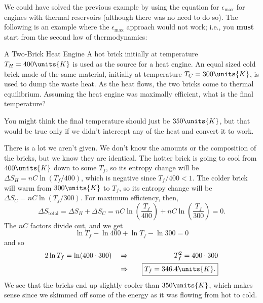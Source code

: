 We could have solved the previous example by using the equation for
$\epsilon_\text{max}$ for engines with thermal reservoirs (although 
there was no need to do so).  The following is an example where 
the $\epsilon_\text{max}$ approach would not work; i.e., you
{\bf must} start from the second law of thermodynamics:
\begin{example}{A Two-Brick Heat Engine}
  \label{example:two_brick_heat_engine}
  A hot brick initially at temperature $T_H=400\units{K}$ is used as
  the source for a heat engine.  An equal sized cold brick made of the
  same material, initially at temperature $T_C=300\units{K}$, is used
  to dump the waste heat.  As the heat flows, the two bricks come to
  thermal equilibrium.  Assuming the heat engine was maximally
  efficient, what is the final temperature?

  \solution You might think the final temperature should just be
  $350\units{K}$, but that would be true only if we didn't intercept
  any of the heat and convert it to work.

  There is a lot we aren't given.  We don't know the amounts
  or the composition of the bricks, but we know they are identical.
  The hotter brick is going to cool from $400\units{K}$ down to some
  $T_f$, so its entropy change will be $\Delta S_H = nC\ln(T_f/400)$,
  which is negative since $T_f/400<1$.  The colder brick will warm
  from $300\units{K}$ to $T_f$, so its entropy change will be $\Delta
  S_C=nC\ln(T_f/300)$.  For maximum efficiency, then,
\begin{equation}
\Delta S_\text{total} = \Delta S_H+ \Delta S_C =
nC\ln\left(\frac{T_f}{400}\right) + nC\ln\left(\frac{T_f}{300}\right)
= 0.
\end{equation}
The $nC$ factors divide out, and we get
\begin{equation}
  \ln T_f - \ln 400 + \ln T_f - \ln 300 = 0
\end{equation}
and so
\begin{eqnarray}
2\ln T_f = \ln(400\cdot 300) \quad&\Rightarrow&\quad 
T_f^2=400\cdot 300  \nonumber \\ 
      &\Rightarrow&\quad \boxed{T_f = 346.4\units{K}.} 
\end{eqnarray}
We see that the bricks end up slightly cooler than $350\units{K}$,
which makes sense since we skimmed off some of the energy as it was
flowing from hot to cold.
\end{example}

